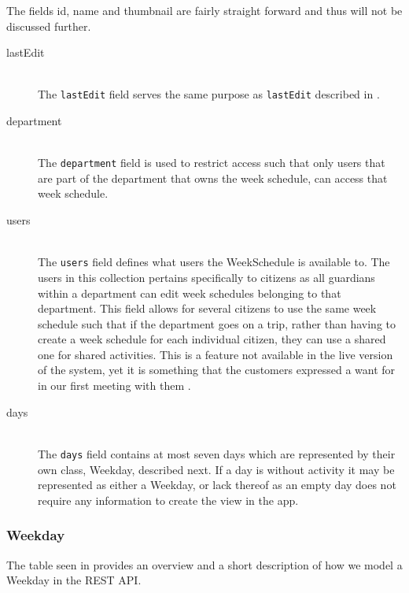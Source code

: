 \noindent
The fields id, name and thumbnail are fairly straight forward and thus will not be discussed further.
\begin{description}
    \item [lastEdit] \hfill \\ 
    The \texttt{lastEdit} field serves the same purpose as \texttt{lastEdit} described in .
    \item [department] \hfill \\
    The \texttt{department} field is used to restrict access such that only users that are part of the department that owns the week schedule, can access that week schedule.
    \item [users] \hfill \\
    The \texttt{users} field defines what users the WeekSchedule is available to.
    The users in this collection pertains specifically to citizens as all guardians within a department can edit week schedules belonging to that department.
    This field allows for several citizens to use the same week schedule such that if the department goes on a trip, rather than having to create a week schedule for each individual citizen, they can use a shared one for shared activities.
    This is a feature not available in the live version of the system, yet it is something that the customers expressed a want for in our first meeting with them \citep{GIRAF20161stMeeting}.
    \item [days] \hfill \\
    The \texttt{days} field contains at most seven days which are represented by their own class, Weekday, described next.
    If a day is without activity it may be represented as either a Weekday, or lack thereof as an empty day does not require any information to create the view in the app.
\end{description}

\subsubsection{Weekday}
The table seen in  provides an overview and a short description of how we model a Weekday in the REST API.

